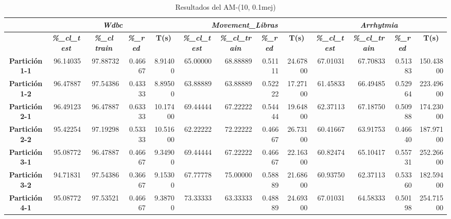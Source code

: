 \documentclass[a4paper,11pt]{article}
\begin{document}
  
  \begin{table}[H]	
  \caption{Resultados del AM-(10, 0.1mej)}
  \begin{adjustbox}{width=1.1\textwidth}
  \begin{tabular}{|c|r|r|r|r|r|r|r|r|r|r|r|r|}
  \hline
  \multicolumn{1}{|l|}{} & \multicolumn{ 4}{c|}{\textbf{\textit{Wdbc}}} & \multicolumn{ 4}{c|}{\textbf{\textit{Movement\_Libras}}} & \multicolumn{ 4}{c|}{\textbf{\textit{Arrhytmia}}} \\ \hline
  \multicolumn{1}{|l|}{} & \multicolumn{1}{c|}{\textbf{\textit{\%\_cl\_test}}} & \multicolumn{1}{c|}{\textbf{\textit{\%\_cl train}}} & \multicolumn{1}{c|}{\textbf{\textit{\%\_red}}} & \multicolumn{1}{c|}{\textbf{T(s)}} & \multicolumn{1}{c|}{\textbf{\textit{\%\_cl\_test}}} & \multicolumn{1}{c|}{\textbf{\textit{\%\_cl\_train}}} & \multicolumn{1}{c|}{\textbf{\textit{\%\_red}}} & \multicolumn{1}{c|}{\textbf{T(s)}} & \multicolumn{1}{c|}{\textbf{\textit{\%\_cl\_test}}} & \multicolumn{1}{c|}{\textbf{\textit{\%\_cl\_train}}} & \multicolumn{1}{c|}{\textbf{\textit{\%\_red}}} & \multicolumn{1}{c|}{\textbf{T(s)}} \\ \hline
  \textbf{Partición 1-1} & 96.14035 & 97.88732 & 0.46667 & 8.91400 & 65.00000 & 68.88889 & 0.51111 & 24.67800 & 67.01031 & 67.70833 & 0.51383 & 150.43800 \\ \hline
  \textbf{Partición 1-2} & 96.47887 & 97.54386 & 0.43333 & 8.89500 & 63.88889 & 63.88889 & 0.52222 & 17.27100 & 61.45833 & 66.49485 & 0.52964 & 223.49600 \\ \hline
  \textbf{Partición 2-1} & 96.49123 & 96.47887 & 0.63333 & 10.17400 & 69.44444 & 67.22222 & 0.54444 & 19.64800 & 62.37113 & 67.18750 & 0.50988 & 174.23000 \\ \hline
  \textbf{Partición 2-2} & 95.42254 & 97.19298 & 0.53333 & 10.51600 & 62.22222 & 72.22222 & 0.46667 & 26.73100 & 60.41667 & 63.91753 & 0.46640 & 187.97100 \\ \hline
  \textbf{Partición 3-1} & 95.08772 & 96.47887 & 0.46667 & 9.34900 & 69.44444 & 67.22222 & 0.46667 & 22.16300 & 60.82474 & 65.10417 & 0.55731 & 252.26600 \\ \hline
  \textbf{Partición 3-2} & 94.71831 & 97.54386 & 0.36667 & 9.15300 & 67.77778 & 75.00000 & 0.58889 & 21.68600 & 60.93750 & 62.37113 & 0.53360 & 182.59400 \\ \hline
  \textbf{Partición 4-1} & 95.08772 & 97.53521 & 0.46667 & 9.38700 & 73.33333 & 63.33333 & 0.48889 & 24.69300 & 67.01031 & 64.58333 & 0.50198 & 254.71500 \\ \hline

\end{tabular}
\end{adjustbox}
\end{table}
\end{document}
